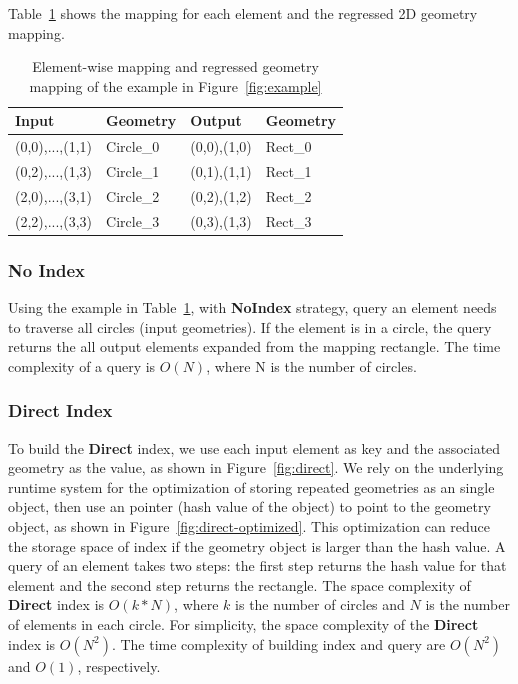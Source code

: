\documentclass{sig-alternate}
\begin{document}
Table~\ref{tb:example} shows the mapping for each element and the regressed 2D geometry mapping.
\begin{table}[ht]
\begin{center}
    \caption{Element-wise mapping and regressed geometry mapping of the example in Figure~\ref{fig:example}}
    \begin{scriptsize}
    \begin{tabular}{ | p{1.75cm} | p{1.75cm} | p{1.75cm} | p{1.75cm} |}
    \hline
    Input & Geometry & Output & Geometry \\ \hline \hline
    (0,0),...,(1,1) & Circle\_0 & (0,0),(1,0) & Rect\_0 \\ \hline
    (0,2),...,(1,3) & Circle\_1 & (0,1),(1,1) & Rect\_1 \\ \hline
    (2,0),...,(3,1) & Circle\_2 & (0,2),(1,2) & Rect\_2 \\ \hline
    (2,2),...,(3,3) & Circle\_3 & (0,3),(1,3) & Rect\_3 \\ \hline
    \end{tabular}
    \end{scriptsize}
    \label{tb:example}
\end{center}   
\end{table} 

\subsubsection{No Index}
Using the example in Table~\ref{tb:example}, with {\bf NoIndex} strategy, query an element needs to traverse all circles (input geometries).
If the element is in a circle, the query returns the all output elements expanded from the mapping rectangle.
The time complexity of a query is $O(N)$, where N is the number of circles. 

\subsubsection{Direct Index}
To build the {\bf Direct} index, we use each input element as key and the associated geometry as the value, as shown in Figure~\ref{fig:direct}.
We rely on the underlying runtime system for the optimization of storing repeated geometries as an single object,
then use an pointer (hash value of the object) to point to the geometry object, as shown in Figure~\ref{fig:direct-optimized}.
This optimization can reduce the storage space of index if the geometry object is larger than the hash value. 
A query of an element takes two steps: the first step returns the hash value for that element and the second step returns the rectangle. 
The space complexity of {\bf Direct} index is $O(k*N)$, where $k$ is the number of circles and $N$ is the number of elements in each circle.
For simplicity, the space complexity of the {\bf Direct} index is $O(N^2)$.
The time complexity of building index and query are $O(N^2)$ and $O(1)$, respectively.
\end{document}
